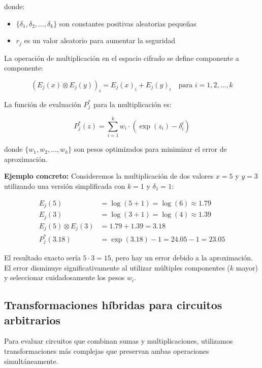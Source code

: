 \documentclass[11pt]{article}
\theoremstyle{plain}
\begin{document}
donde:
\begin{itemize}
    \item $\{\delta_1, \delta_2, \ldots, \delta_k\}$ son constantes positivas aleatorias peque\~nas
    \item $r_j$ es un valor aleatorio para aumentar la seguridad
\end{itemize}

La operaci\'on de multiplicaci\'on en el espacio cifrado se define componente a componente:

\begin{equation}
(E_j(x) \otimes E_j(y))_i = E_j(x)_i + E_j(y)_i \quad \text{para } i = 1, 2, \ldots, k
\end{equation}

La funci\'on de evaluaci\'on $P^*_j$ para la multiplicaci\'on es:

\begin{equation}
P^*_j(z) = \sum_{i=1}^k w_i \cdot (\exp(z_i) - \delta_i^i)
\end{equation}

donde $\{w_1, w_2, \ldots, w_k\}$ son pesos optimizados para minimizar el error de aproximaci\'on.

\textbf{Ejemplo concreto:} Consideremos la multiplicaci\'on de dos valores $x = 5$ y $y = 3$ utilizando una versi\'on simplificada con $k = 1$ y $\delta_1 = 1$:

\begin{align}
E_j(5) &= \log(5 + 1) = \log(6) \approx 1.79 \\
E_j(3) &= \log(3 + 1) = \log(4) \approx 1.39 \\
E_j(5) \otimes E_j(3) &= 1.79 + 1.39 = 3.18 \\
P^*_j(3.18) &= \exp(3.18) - 1 = 24.05 - 1 = 23.05
\end{align}

El resultado exacto ser\'ia $5 \cdot 3 = 15$, pero hay un error debido a la aproximaci\'on. El error disminuye significativamente al utilizar m\'ultiples componentes ($k$ mayor) y seleccionar cuidadosamente los pesos $w_i$.

\subsection{Transformaciones h\'ibridas para circuitos arbitrarios}

Para evaluar circuitos que combinan sumas y multiplicaciones, utilizamos transformaciones m\'as complejas que preservan ambas operaciones simult\'aneamente.
\end{document}
